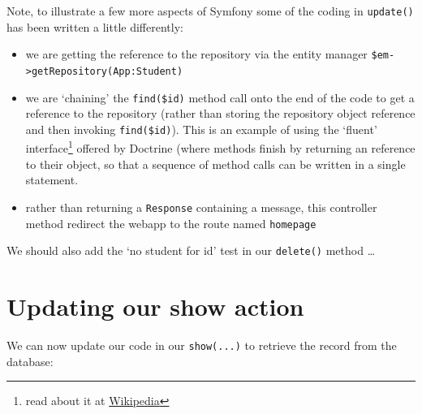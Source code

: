 \documentclass[a4paperpaper,openright]{book}
\newenvironment{Shaded}{}{}
\newcommand{\KeywordTok}[1]{\textcolor[rgb]{0.00,0.44,0.13}{\textbf{#1}}}
\newcommand{\NormalTok}[1]{#1}
\newcommand{\OtherTok}[1]{\textcolor[rgb]{0.00,0.44,0.13}{#1}}
\newcommand{\StringTok}[1]{\textcolor[rgb]{0.25,0.44,0.63}{#1}}
\providecommand{\tightlist}{%
  \setlength{\itemsep}{0pt}\setlength{\parskip}{0pt}}
\begin{document}
Note, to illustrate a few more aspects of Symfony some of the coding in
\texttt{update()} has been written a little differently:

\begin{itemize}
\tightlist
\item
  we are getting the reference to the repository via the entity manager
  \texttt{\$em-\textgreater{}getRepository(\textquotesingle{}App:Student\textquotesingle{})}
\item
  we are `chaining' the \texttt{find(\$id)} method call onto the end of
  the code to get a reference to the repository (rather than storing the
  repository object reference and then invoking \texttt{find(\$id)}).
  This is an example of using the `fluent' interface\footnote{read about
    it at
    \href{https://en.wikipedia.org/wiki/Fluent_interface}{Wikipedia}}
  offered by Doctrine (where methods finish by returning an reference to
  their object, so that a sequence of method calls can be written in a
  single statement.
\item
  rather than returning a \texttt{Response} containing a message, this
  controller method redirect the webapp to the route named
  \texttt{homepage}
\end{itemize}

We should also add the `no student for id' test in our \texttt{delete()}
method \ldots{}

\hypertarget{updating-our-show-action}{%
\section{Updating our show action}\label{updating-our-show-action}}

We can now update our code in our \texttt{show(...)} to retrieve the
record from the database:

\begin{Shaded}
\end{Shaded}
\end{document}
